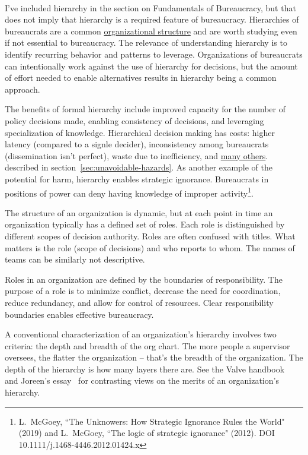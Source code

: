 \ \\

I've included hierarchy in the section on Fundamentals of Bureaucracy, but that does not imply that hierarchy is a required feature of bureaucracy. Hierarchies of bureaucrats are a common \href{https://en.wikipedia.org/wiki/Organizational_structure}{organizational structure} and are worth studying even if not essential to bureaucracy. The relevance of understanding hierarchy is to identify recurring behavior and patterns to leverage.
Organizations of bureaucrats can intentionally work against the use of hierarchy for decisions, but the amount of effort needed to enable alternatives results in hierarchy being a common approach.

The benefits of formal hierarchy include improved capacity for the number of policy decisions made, enabling consistency of decisions, and leveraging specialization of knowledge. 
Hierarchical decision making has costs: higher latency (compared to a signle decider), inconsistency among bureaucrats (dissemination isn't perfect), waste due to inefficiency, and 
\hyperref[sec:unavoidable-hazards]{many others}.
\ifsectionref
described in section~\ref{sec:unavoidable-hazards}. 
\fi
As another example of the potential for harm, hierarchy enables strategic ignorance. Bureaucrats in positions of power can deny having knowledge of improper activity\footnote{L.~McGoey, ``The Unknowers: How Strategic Ignorance Rules the World" (2019)
and 
L.~McGoey, ``The logic of strategic ignorance" (2012). DOI 
10.1111/j.1468-4446.2012.01424.x
}. 



The structure of an organization is dynamic, but at each point in time an organization typically has a defined set of roles. Each role is distinguished by different scopes of decision authority. 
Roles are often confused with titles. What matters is the role (scope of decisions) and who reports to whom. The names of teams can be similarly not descriptive.




Roles in an organization are defined by the boundaries of responsibility. The purpose of a role is to minimize conflict, decrease the need for coordination, reduce redundancy, and allow for control of resources. Clear responsibility boundaries enables effective bureaucracy. 


A conventional characterization of an organization's hierarchy involves two criteria: the depth and breadth of the org chart.
The more people a supervisor oversees, the flatter the organization -- that's the breadth of the organization. The depth of the hierarchy is how many layers there are. See the Valve handbook~\cite{2012_Valve} and Joreen's essay~\cite{1972_Joreen} for contrasting views on the merits of an organization's hierarchy. 

